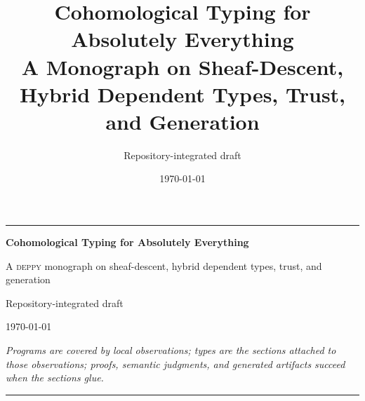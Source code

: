 \documentclass[11pt]{report}
\title{Cohomological Typing for Absolutely Everything\\
\large A \DepPy{} Monograph on Sheaf-Descent, Hybrid Dependent Types, Trust, and Generation}
\author{Repository-integrated draft}
\date{\today}
\newcommand{\DepPy}{\textsc{deppy}}
\theoremstyle{definition}
\theoremstyle{plain}
\begin{document}
\begin{titlepage}
\thispagestyle{empty}
\centering
\vspace*{2.5cm}
{\color{chapterblue}\rule{0.82\textwidth}{1.2pt}\par}
\vspace{1.25cm}
{\Huge\bfseries Cohomological Typing for Absolutely Everything\par}
\vspace{0.6cm}
{\Large\color{chapterblue}A \DepPy{} monograph on sheaf-descent, hybrid dependent types, trust, and generation\par}
\vspace{1.3cm}
{\large Repository-integrated draft\par}
\vspace{0.25cm}
{\large \today\par}
\vfill
\begin{minipage}{0.84\textwidth}
\centering
\textit{Programs are covered by local observations; types are the sections attached to those observations; proofs, semantic judgments, and generated artifacts succeed when the sections glue.}
\end{minipage}
\vfill
{\color{accentgold}\rule{0.82\textwidth}{1.2pt}\par}
\end{titlepage}

\end{document}
